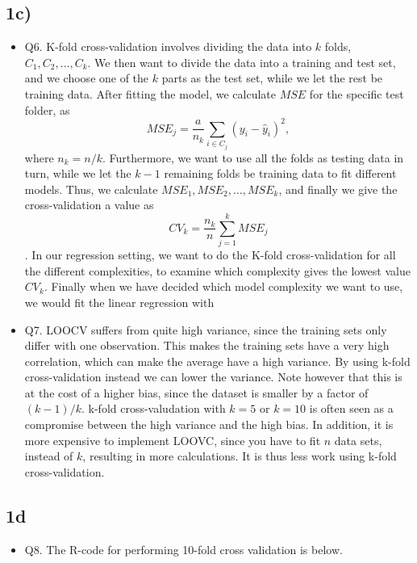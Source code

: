 \documentclass[]{article}
\providecommand{\tightlist}{%
  \setlength{\itemsep}{0pt}\setlength{\parskip}{0pt}}
\begin{document}
\subsection{1c)}\label{c}

\begin{itemize}
\tightlist
\item
  Q6. K-fold cross-validation involves dividing the data into \(k\)
  folds, \(C_1, C_2, \dots, C_k\). We then want to divide the data into
  a training and test set, and we choose one of the \(k\) parts as the
  test set, while we let the rest be training data. After fitting the
  model, we calculate \(MSE\) for the specific test folder, as
  \[MSE_j=\frac{a}{n_k}\sum_{i \in C_j}(y_i-\hat y_i)^2,\] where
  \(n_k=n/k\). Furthermore, we want to use all the folds as testing data
  in turn, while we let the \(k-1\) remaining folds be training data to
  fit different models. Thus, we calculate
  \(MSE_1, MSE_2,\dots, MSE_k\), and finally we give the
  cross-validation a value as \[CV_k=\frac{n_k}{n}\sum_{j=1}^k MSE_j\].
  In our regression setting, we want to do the K-fold cross-validation
  for all the different complexities, to examine which complexity gives
  the lowest value \(CV_k\). Finally when we have decided which model
  complexity we want to use, we would fit the linear regression with
\item
  Q7. LOOCV suffers from quite high variance, since the training sets
  only differ with one observation. This makes the training sets have a
  very high correlation, which can make the average have a high
  variance. By using k-fold cross-validation instead we can lower the
  variance. Note however that this is at the cost of a higher bias,
  since the dataset is smaller by a factor of \((k-1)/k\). k-fold
  cross-valudation with \(k=5\) or \(k=10\) is often seen as a
  compromise between the high variance and the high bias. In addition,
  it is more expensive to implement LOOVC, since you have to fit \(n\)
  data sets, instead of \(k\), resulting in more calculations. It is
  thus less work using k-fold cross-validation.
\end{itemize}

\subsection{1d}\label{d}

\begin{itemize}
\tightlist
\item
  Q8. The R-code for performing 10-fold cross validation is below.
\end{itemize}
\end{document}

